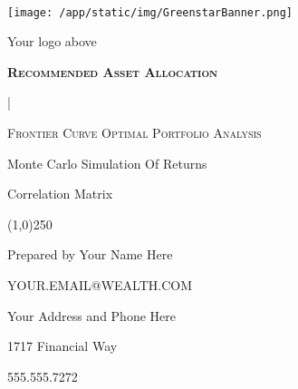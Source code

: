 \documentclass{article}
\begin{document}
\begin{titlepage}   %

\begin{center}
	{\scshape\Large\bfseries \, \par}
	\vspace{5cm}


	\texttt{[image: /app/static/img/GreenstarBanner.png]}\par
    \vspace{-.2cm}

	Your logo above



	\vspace{0,5cm}
	{\scshape\Large\bfseries Recommended Asset Allocation

	{} | {} \par}
	\vspace{0,5cm}
	{\scshape\normalsize Frontier Curve Optimal Portfolio Analysis

	Monte Carlo Simulation Of Returns

	Correlation Matrix \par}
\end{center}

	\begin{center}
\line(1,0){250}
\end{center}

	\begin{center}
	 	{
		\small{
		Prepared by Your Name Here

		YOUR.EMAIL@WEALTH.COM}
		\par}


	\vfill
\end{center}

	\vfill

	{\begin{center}

    	 Your Address and Phone Here

	     1717 Financial Way

	     555.555.7272

	\end{center}}

\end{titlepage}


\tableofcontents    %

\begin{center}
\vfill
\vfill

\end{center}
\justify
\end{document}
